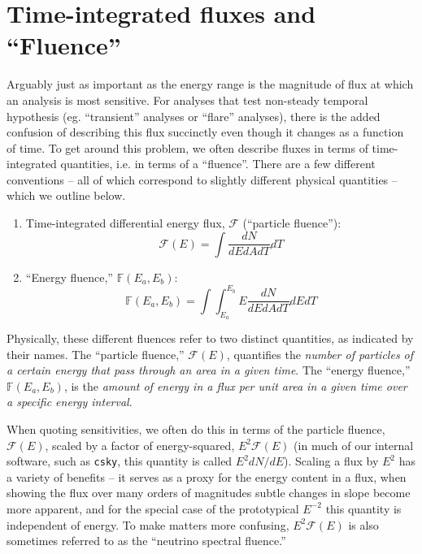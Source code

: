 \documentclass[a4paper,11pt]{article}
\begin{document}
\section{Time-integrated fluxes and ``Fluence''}
Arguably just as important as the energy range is the magnitude of flux at which an analysis is most sensitive. For analyses that test non-steady temporal hypothesis (eg. ``transient'' analyses or ``flare'' analyses), there is the added confusion of describing this flux succinctly even though it changes as a function of time. To get around this problem, we often describe fluxes in terms of time-integrated quantities, i.e. in terms of a ``fluence''. There are a few different conventions -- all of which correspond to slightly different physical quantities -- which we outline below.
\begin{enumerate}
    \item Time-integrated differential energy flux, $\mathcal{F}$ (``particle fluence''):
    \begin{equation}
        \mathcal{F}(E) = \int \frac{dN}{dEdAdT} dT
    \end{equation}
    \item ``Energy fluence,'' $\mathbb{F}(E_a, E_b)$:
    \begin{equation}
        \mathbb{F}(E_a, E_b) = \int\int_{E_a}^{E_b} E \frac{dN}{dEdAdT} dEdT
    \end{equation}
\end{enumerate}

Physically, these different fluences refer to two distinct quantities, as indicated by their names. The ``particle fluence,'' $\mathcal{F}(E)$, quantifies the \textit{number of particles of a certain energy that pass through an area in a given time}. The ``energy fluence,'' $\mathbb{F}(E_a, E_b)$, is the \textit{amount of energy in a flux per unit area in a given time over a specific energy interval}.

When quoting sensitivities, we often do this in terms of the particle fluence, $\mathcal{F}(E)$, scaled by a factor of energy-squared, $E^2\mathcal{F}(E)$ (in much of our internal software, such as \texttt{csky}, this quantity is called $E^2dN/dE$). Scaling a flux by $E^2$ has a variety of benefits -- it serves as a proxy for the energy content in a flux, when showing the flux over many orders of magnitudes subtle changes in slope become more apparent, and for the special case of the prototypical $E^{-2}$ this quantity is independent of energy. To make matters more confusing, $E^2\mathcal{F}(E)$ is also sometimes referred to as the ``neutrino spectral fluence.''
\end{document}
